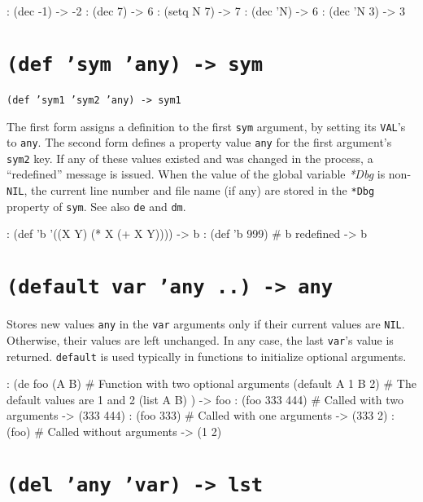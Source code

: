 \begin{wideverbatim}
: (dec -1)
-> -2
: (dec 7)
-> 6
: (setq N 7)
-> 7
: (dec 'N)
-> 6
: (dec 'N 3)
-> 3
\end{wideverbatim}

 
\section*{\texttt{(def 'sym 'any) -> sym}}
\label{sec:func-ref-D-(def 'sym 'any) -> sym}


\texttt{(def 'sym1 'sym2 'any) -> sym1}

The first form assigns a definition to the first \texttt{sym} argument, by
setting its \texttt{VAL}'s to \texttt{any}. The second form defines a property value
\texttt{any} for the first argument's \texttt{sym2} key. If any of these values
existed and was changed in the process, a ``redefined'' message is issued.
When the value of the global variable \emph{*Dbg} is
non-\texttt{NIL}, the current line number and file name (if any) are stored in
the \texttt{*Dbg} property of \texttt{sym}. See also \texttt{de} and \texttt{dm}.


\begin{wideverbatim}
: (def 'b '((X Y) (* X (+ X Y))))
-> b
: (def 'b 999)
# b redefined
-> b
\end{wideverbatim}

 
\section*{\texttt{(default var 'any ..) -> any}}
\label{sec:func-ref-D-(default var 'any ..) -> any}


Stores new values \texttt{any} in the \texttt{var} arguments only if their current
values are \texttt{NIL}. Otherwise, their values are left unchanged. In any
case, the last \texttt{var}'s value is returned. \texttt{default} is used typically in
functions to initialize optional arguments.


\begin{wideverbatim}
: (de foo (A B)               # Function with two optional arguments
   (default  A 1  B 2)        # The default values are 1 and 2
   (list A B) )
-> foo
: (foo 333 444)               # Called with two arguments
-> (333 444)
: (foo 333)                   # Called with one arguments
-> (333 2)
: (foo)                       # Called without arguments
-> (1 2)
\end{wideverbatim}

 
\section*{\texttt{(del 'any 'var) -> lst}}
\label{sec:func-ref-D-(del 'any 'var) -> lst}


